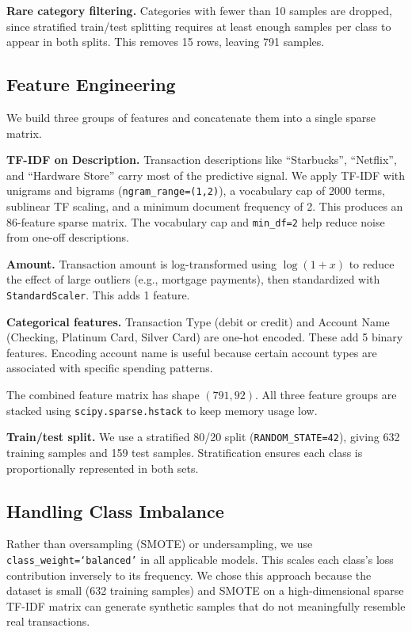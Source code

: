 \documentclass[11pt]{article}
\begin{document}
\textbf{Rare category filtering.} Categories with fewer than 10 samples are dropped, since stratified train/test splitting requires at least enough samples per class to appear in both splits. This removes 15 rows, leaving 791 samples.

\subsection{Feature Engineering}

We build three groups of features and concatenate them into a single sparse matrix.

\textbf{TF-IDF on Description.} Transaction descriptions like ``Starbucks'', ``Netflix'', and ``Hardware Store'' carry most of the predictive signal. We apply TF-IDF with unigrams and bigrams (\texttt{ngram\_range=(1,2)}), a vocabulary cap of 2000 terms, sublinear TF scaling, and a minimum document frequency of 2. This produces an 86-feature sparse matrix. The vocabulary cap and \texttt{min\_df=2} help reduce noise from one-off descriptions.

\textbf{Amount.} Transaction amount is log-transformed using $\log(1 + x)$ to reduce the effect of large outliers (e.g., mortgage payments), then standardized with \texttt{StandardScaler}. This adds 1 feature.

\textbf{Categorical features.} Transaction Type (debit or credit) and Account Name (Checking, Platinum Card, Silver Card) are one-hot encoded. These add 5 binary features. Encoding account name is useful because certain account types are associated with specific spending patterns.

The combined feature matrix has shape $(791, 92)$. All three feature groups are stacked using \texttt{scipy.sparse.hstack} to keep memory usage low.

\textbf{Train/test split.} We use a stratified 80/20 split (\texttt{RANDOM\_STATE=42}), giving 632 training samples and 159 test samples. Stratification ensures each class is proportionally represented in both sets.

\subsection{Handling Class Imbalance}

Rather than oversampling (SMOTE) or undersampling, we use \texttt{class\_weight=`balanced'} in all applicable models. This scales each class's loss contribution inversely to its frequency. We chose this approach because the dataset is small (632 training samples) and SMOTE on a high-dimensional sparse TF-IDF matrix can generate synthetic samples that do not meaningfully resemble real transactions.
\end{document}
